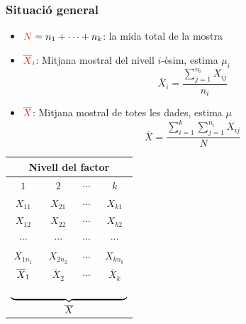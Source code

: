 \documentclass[12pt,t]{beamer}
\newcommand{\red}[1]{\textcolor{red}{#1}}
\theoremstyle{plain}
\theoremstyle{definition}
\begin{document}
\begin{frame}
\frametitle{Situació general}\vspace*{-2ex}

\begin{itemize}

\item $\red{N}=n_1+\cdots+n_k$: la mida total de la mostra\smallskip

\item $\red{\overline{X}_{i}}$: Mitjana mostral del nivell $i$-èsim, estima  $\mu_i$
$$ 
\overline{X}_{i}= \frac{\sum_{j=1}^{n_i} X_{ij}}{n_i}
$$


\item $\red{\overline{X}}$: Mitjana mostral de totes les dades, estima $\mu$
$${\overline{X}}=\frac{\sum_{i=1}^k \sum_{j=1}^{n_i} X_{ij}}{N}
$$
\end{itemize}

\begin{center}
\small \begin{tabular}{cccc}
\multicolumn{4}{c}{Nivell del factor}\\\hline
$1$&$2$&$\cdots$&$k$\\\hline
$X_{11}$&$X_{21}$&$\cdots$&$X_{k1}$\\
$X_{12}$&$X_{22}$&$\cdots$&$X_{k2}$\\
$\cdots$&$\cdots$&$\cdots$&$\cdots$\\
$X_{1n_1}$&$X_{2n_2}$&$\cdots$&$X_{kn_k}$\\\hline
$\vphantom{\int^A}\overline{X}_{1}$ &$\overline{X}_{2}$ & $\cdots$&$\overline{X}_{k}$\\[-2ex]
\multicolumn{4}{c}{$\underbrace{\hphantom{\overline{X}_{1}+\overline{X}_{1}+\overline{X}_{1}+\overline{X}_{1}+\overline{X}_{1}}}_{\displaystyle \overline{X}}$}
\end{tabular}
\end{center}

\end{frame}
\end{document}
